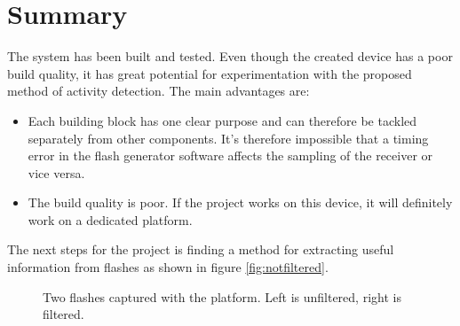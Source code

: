 \section{Summary}
The system has been built and tested. Even though the created device has a poor build quality, it has great potential for experimentation with the proposed method of activity detection. The main advantages are:
\begin{itemize}[itemsep=-1ex]
	\item Each building block has one clear purpose and can therefore be tackled separately from other components. It's therefore impossible that a timing error in the flash generator software affects the sampling of the receiver or vice versa.
	\item The build quality is poor. If the project works on this device, it will definitely work on a dedicated platform.
\end{itemize}
The next steps for the project is finding a method for extracting useful information from flashes as shown in figure \ref{fig:notfiltered}. 

\begin{figure}
	\centering     %
	\caption{Two flashes captured with the platform. Left is unfiltered, right is filtered.	\label{fig:FristFlashes}}
\end{figure}